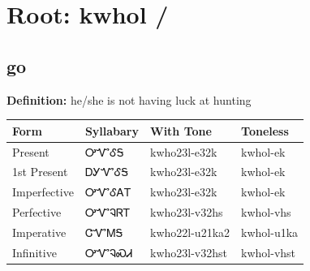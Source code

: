 \documentclass{article}%
\begin{document}
%
\normalsize%
\section*{Root: kwhol / }%
\subsection*{go}%
\textbf{Definition: }%
he/she is not having luck at hunting%
\\[0.5em]%
\begin{tabular}{|l|l|l|l|}%
\hline%
\textbf{Form}&\textbf{Syllabary}&\textbf{With Tone}&\textbf{Toneless}\\%
\hline%
Present&ᎤᏉᎴᎦ&kwho23l{-}e32k&kwhol{-}ek\\%
1st Present&ᎠᎩᏉᎴᎦ&kwho23l{-}e32k&kwhol{-}ek\\%
Imperfective&ᎤᏉᎴᎪᎢ&kwho23l{-}e32k&kwhol{-}ek\\%
Perfective&ᎤᏉᎸᏒᎢ&kwho23l{-}v32hs&kwhol{-}vhs\\%
Imperative&ᏣᏉᎷᎦ&kwho22l{-}u21ka2&kwhol{-}u1ka\\%
Infinitive&ᎤᏉᎸᏍᏗ&kwho23l{-}v32hst&kwhol{-}vhst\\%
\hline%
\end{tabular}%
\\[1em]%
\end{document}
